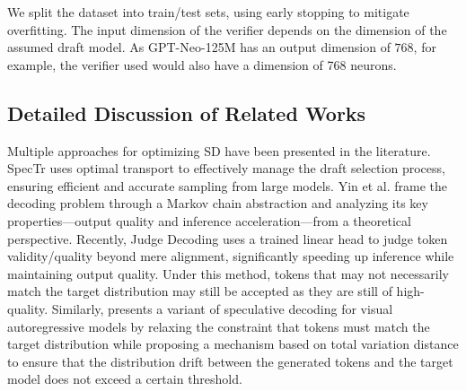 \documentclass{article}
\theoremstyle{plain}
\theoremstyle{definition}
\theoremstyle{remark}
\begin{document}
We split the dataset into train/test sets, using early stopping to mitigate overfitting. The input dimension of the verifier depends on the dimension of the assumed draft model. As GPT-Neo-125M has an output dimension of $768$, for example, the verifier used would also have a dimension of 768 neurons. 



\subsection{Detailed Discussion of Related Works}
\label{sec:relatedworks_append}

Multiple approaches for optimizing SD have been presented in the literature. SpecTr \cite{sun2024spectr} uses optimal transport to effectively manage the draft selection process, ensuring efficient and accurate sampling from large models. Yin et al. \cite{yin2024theoretical} frame the decoding problem through a Markov chain abstraction and analyzing its key properties—output quality and inference acceleration—from a theoretical perspective. Recently, Judge Decoding \cite{judge} uses a trained linear head to judge token validity/quality beyond mere alignment, significantly speeding up inference while maintaining output quality. Under this method, tokens that may not necessarily match the target distribution may still be accepted as they are still of high-quality. Similarly, \cite{jang2024lanternacceleratingvisualautoregressive} presents a variant of speculative decoding for visual autoregressive models by relaxing the constraint that tokens must match the target distribution while proposing a mechanism based on total variation distance to ensure that the distribution drift between the generated tokens and the target model does not exceed a certain threshold. 
\end{document}
